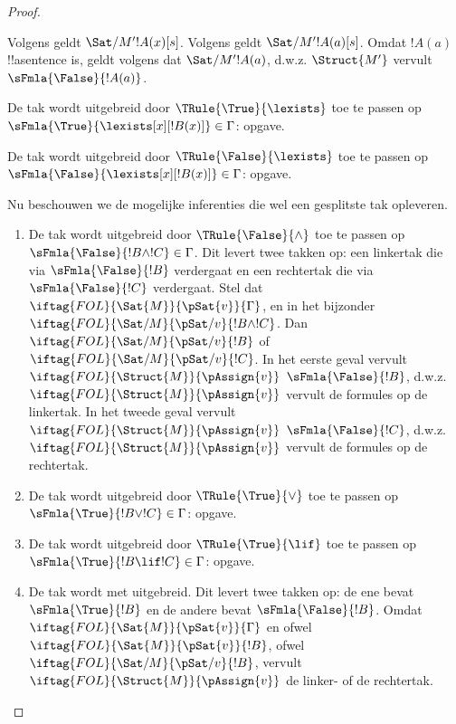 \documentclass[openany]{memoir}
\begin{document}
\begin{proof}
\begin{enumerate}
{  Volgens  geldt
  $\Sat/{M'}{!A(x)}[s]$. Volgens
   geldt $\Sat/{M'}{!A(a)}[s]$.
  Omdat $!A(a)$ !!a{sentence} is, geldt volgens
   dat
  $\Sat/{M'}{!A(a)}$, d.w.z. $\Struct{M'}$ vervult
  $\sFmla{\False}{!A(a)}$.
\item De tak wordt uitgebreid door $\TRule{\True}{\lexists}$ toe te
  passen op $\sFmla{\True}{\lexists[x][!B(x)]} \in \Gamma$: opgave.
\item De tak wordt uitgebreid door $\TRule{\False}{\lexists}$ toe te
  passen op $\sFmla{\False}{\lexists[x][!B(x)]} \in \Gamma$: opgave.}{}
\end{enumerate}
Nu beschouwen we de mogelijke inferenties die wel een gesplitste tak
opleveren.
\begin{enumerate}
\item De tak wordt uitgebreid door $\TRule{\False}{\land}$ toe te
  passen op $\sFmla{\False}{!B \land !C} \in \Gamma$. Dit levert twee
  takken op: een linkertak die via $\sFmla{\False}{!B}$ verdergaat en
  een rechtertak die via $\sFmla{\False}{!C}$ verdergaat. Stel dat
  $\iftag{FOL}{\Sat{M}}{\pSat{v}}{\Gamma}$, en in het bijzonder
  $\iftag{FOL}{\Sat/{M}}{\pSat/{v}}{!B \land !C}$. Dan
  $\iftag{FOL}{\Sat/{M}}{\pSat/{v}}{!B}$ of
  $\iftag{FOL}{\Sat/{M}}{\pSat/{v}}{!C}$. In het eerste geval vervult
  $\iftag{FOL}{\Struct{M}}{\pAssign{v}}$
  $\sFmla{\False}{!B}$, d.w.z.
  $\iftag{FOL}{\Struct{M}}{\pAssign{v}}$ vervult de formules op de
  linkertak. In het tweede geval vervult
  $\iftag{FOL}{\Struct{M}}{\pAssign{v}}$ $\sFmla{\False}{!C}$, d.w.z.
  $\iftag{FOL}{\Struct{M}}{\pAssign{v}}$ vervult de formules op de
  rechtertak.
\item De tak wordt uitgebreid door $\TRule{\True}{\lor}$ toe te
  passen op $\sFmla{\True}{!B \lor !C} \in \Gamma$: opgave.
\item De tak wordt uitgebreid door $\TRule{\True}{\lif}$ toe te
  passen op $\sFmla{\True}{!B \lif !C} \in \Gamma$: opgave.
\item De tak wordt met \Cut uitgebreid. Dit levert twee takken op:
  de ene bevat $\sFmla{\True}{!B}$ en de andere bevat
  $\sFmla{\False}{!B}$. Omdat $\iftag{FOL}{\Sat{M}}{\pSat{v}}{\Gamma}$
  en ofwel $\iftag{FOL}{\Sat{M}}{\pSat{v}}{!B}$, ofwel
  $\iftag{FOL}{\Sat/{M}}{\pSat/{v}}{!B}$,
  vervult $\iftag{FOL}{\Struct{M}}{\pAssign{v}}$ de linker- of de
  rechtertak.
\end{enumerate}
\end{proof}
\end{document}
